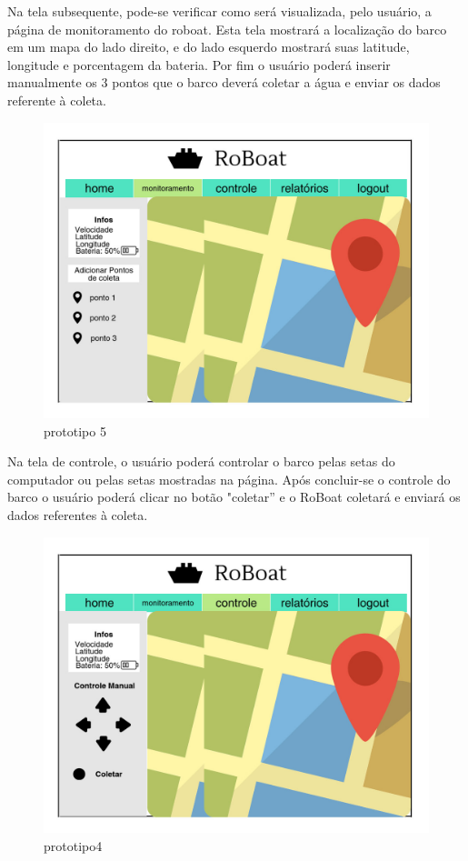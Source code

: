 Na tela subsequente, pode-se verificar como será visualizada, pelo usuário, a página de monitoramento do roboat. Esta tela mostrará a localização do barco em um mapa do lado direito, e do lado esquerdo mostrará suas latitude, longitude e porcentagem da bateria. Por fim o usuário poderá inserir manualmente os 3 pontos que o barco deverá coletar a água e enviar os dados referente à coleta.


\FloatBarrier
 \begin{figure} [!htp]
	\centering
	\includegraphics[scale=0.3]{figuras/prototipo-5}
	\caption{prototipo 5}
	\label{fig:prototipo5}
\end{figure}
\FloatBarrier

Na tela de controle, o usuário poderá controlar o barco pelas setas do computador ou pelas setas mostradas na página. Após concluir-se o controle do barco o usuário poderá clicar no botão "coletar” e o RoBoat coletará e enviará os dados referentes à coleta.

 \begin{figure} [!htp]
	\centering
	\includegraphics[scale=0.3]{figuras/prototipo-4}
	\caption{prototipo4}
	\label{Prototipo 4}
\end{figure}
\FloatBarrier

